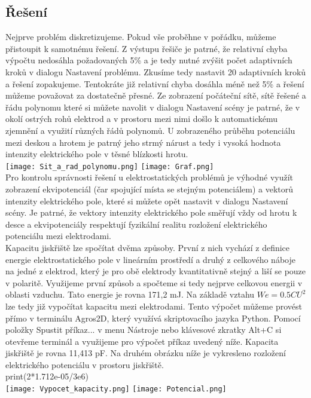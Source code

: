 \documentclass[a4paper, oneside]{article}
\begin{document}
\subsection{Řešení}
\indent Nejprve problém diskretizujeme. Pokud vše proběhne v pořádku, můžeme přistoupit k samotnému řešení. Z výstupu řešiče je patrné, že relativní chyba výpočtu nedosáhla požadovaných 5\% a je tedy nutné zvýšit počet adaptivních kroků v dialogu Nastavení problému. Zkusíme tedy nastavit 20 adaptivních kroků a řešení zopakujeme. Tentokráte již relativní chyba dosáhla méně než 5\% a řešení můžeme považovat za dostatečně přesné. Ze zobrazení počáteční sítě, sítě řešené a řádu polynomu které si můžete navolit v dialogu Nastavení scény je patrné, že v okolí ostrých rohů elektrod a v prostoru mezi nimi došlo k automatickému zjemnění a využití různých řádů polynomů. U zobrazeného průběhu potenciálu mezi deskou a hrotem je patrný jeho strmý nárust a tedy i vysoká hodnota intenzity elektrického pole v těsné blízkosti hrotu.\\
\texttt{[image: Sit\_a\_rad\_polynomu.png]}
\texttt{[image: Graf.png]}\\ 	
\indent Pro kontrolu správnosti řešení u elektrostatických problémů je výhodné využít zobrazení ekvipotenciál (čar spojující místa se stejným potenciálem) a vektorů intenzity elektrického pole, které si můžete opět nastavit v dialogu Nastavení scény. Je patrné, že vektory intenzity elektrického pole směřují vždy od hrotu k desce a ekvipotenciály respektují fyzikální realitu rozložení elektrického potenciálu mezi elektrodami.\\
\indent Kapacitu jiskřiště lze spočítat dvěma způsoby. První z nich vychází z definice energie elektrostatického pole v lineárním prostředí a druhý z celkového náboje na jedné z elektrod, který je pro obě elektrody kvantitativně stejný a liší se pouze v polaritě. Využijeme první způsob a spočteme si tedy nejprve celkovou energii v oblasti vzduchu. Tato energie je rovna 171,2 mJ. Na základě vztahu $We = 0.5 CU^2$ lze tedy již vypočítat kapacitu mezi elektrodami. Tento výpočet můžeme provést přímo v terminálu Agros2D, který využívá skriptovacího jazyka Python. Pomocí položky Spustit příkaz... v menu Nástroje nebo klávesové zkratky Alt+C si otevřeme terminál a využijeme pro výpočet příkaz uvedený níže. Kapacita jiskřiště je rovna 11,413 pF. Na druhém obrázku níže je vykresleno rozložení elektrického potenciálu v prostoru jiskřiště.\\
print(2*1.712e-05/3e6)\\
\texttt{[image: Vypocet\_kapacity.png]}
\texttt{[image: Potencial.png]}
\newpage
\end{document}
